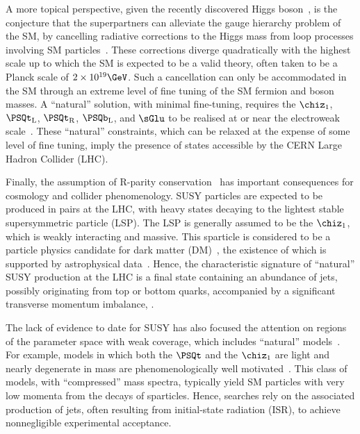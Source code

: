 A more topical perspective, given the recently discovered Higgs
boson~\cite{ref:atlashiggsdiscovery, ref:cmshiggsdiscovery,
  ref:cmshiggsdiscoverylong}, is the conjecture that the superpartners
can alleviate the gauge hierarchy problem of the SM, 
by cancelling radiative corrections to the Higgs mass from loop
processes involving SM particles~\cite{ref:hierarchy1,
  ref:hierarchy2}. These corrections diverge quadratically with the
highest scale up to which the SM is expected to be a valid theory,
often taken to be a Planck scale of $2\times10^{19}\GeV$. Such a
cancellation can only be accommodated in the SM through an extreme
level of fine tuning of the SM fermion and boson masses. A ``natural''
solution, with minimal fine-tuning, requires the $\chiz_1$,
$\PSQt_\text{L}$, $\PSQt_\text{R}$, $\PSQb_\text{L}$, and $\sGlu$ to
be realised at or near the electroweak scale~\cite{ref:barbierinsusy}.
These ``natural'' constraints, which can be relaxed at the expense of
some level of fine tuning, imply the presence of states accessible by
the CERN Large Hadron Collider (LHC).

Finally, the assumption of R-parity conservation~\cite{Farrar:1978xj}
has important consequences for cosmology and collider
phenomenology. SUSY particles are expected to be produced in pairs at
the LHC, with heavy states decaying to the lightest stable
supersymmetric particle (LSP). The LSP is generally assumed to be the
$\chiz_1$, which is weakly interacting and massive. This sparticle is
considered to be a particle physics candidate for dark matter
(DM)~\cite{Jungman:1995df}, the existence of which is supported by
astrophysical data~\cite{1674-1137-38-9-090001}.  Hence, the
characteristic signature of ``natural'' SUSY production at the LHC is
a final state containing an abundance of jets, possibly originating
from top or bottom quarks, accompanied by a significant transverse
momentum imbalance, \ptvecmiss.

The lack of evidence to date for SUSY has also focused the attention
on regions of the parameter space with weak coverage, which includes
``natural'' models~\cite{Delgado:2012eu, Boehm:1999tr, Carena:2008mj,
  Grober:2014aha, Grober:2015fia}. For example, models in which both
the $\PSQt$ and the $\chiz_1$ are light and nearly degenerate in mass
are phenomenologically well motivated~\cite{Boehm:1999bj,
  Balazs:2004bu, Martin:2007gf, Martin:2007hn}. This class of models,
with ``compressed'' mass spectra, typically yield SM particles with
very low momenta from the decays of sparticles. Hence, searches rely
on the associated production of jets, often resulting from
initial-state radiation (ISR), to achieve nonnegligible experimental
acceptance.

